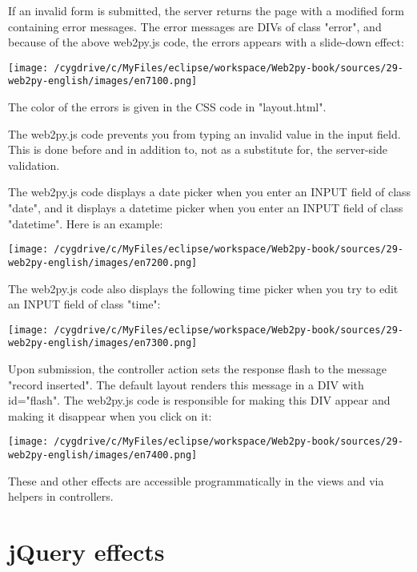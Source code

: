 \documentclass[justified,sixbynine,notoc]{tufte-book}
\begin{document}
\begin{fullwidth}
If an invalid form is submitted, the server returns the page with a modified form containing error messages. The error messages are DIVs of class "error", and because of the above web2py.js code, the errors appears with a slide-down effect:


\goodbreak\begin{center}\texttt{[image: /cygdrive/c/MyFiles/eclipse/workspace/Web2py-book/sources/29-web2py-english/images/en7100.png]}\end{center}


The color of the errors is given in the CSS code in "layout.html".

The web2py.js code prevents you from typing an invalid value in the input field. This is done before and in addition to, not as a substitute for, the server-side validation.

The web2py.js code displays a date picker when you enter an INPUT field of class "date", and it displays a datetime picker when you enter an INPUT field of class "datetime". Here is an example:


\goodbreak\begin{center}\texttt{[image: /cygdrive/c/MyFiles/eclipse/workspace/Web2py-book/sources/29-web2py-english/images/en7200.png]}\end{center}


The web2py.js code also displays the following time picker when you try to edit an INPUT field of class "time":


\goodbreak\begin{center}\texttt{[image: /cygdrive/c/MyFiles/eclipse/workspace/Web2py-book/sources/29-web2py-english/images/en7300.png]}\end{center}


Upon submission, the controller action sets the response flash to the message "record inserted". The default layout renders this message in a DIV with id="flash". The web2py.js code is responsible for making this DIV appear and making it disappear when you click on it:


\goodbreak\begin{center}\texttt{[image: /cygdrive/c/MyFiles/eclipse/workspace/Web2py-book/sources/29-web2py-english/images/en7400.png]}\end{center}


These and other effects are accessible programmatically in the views and via helpers in controllers.

\goodbreak\section{jQuery effects}


\end{fullwidth}
\end{document}
